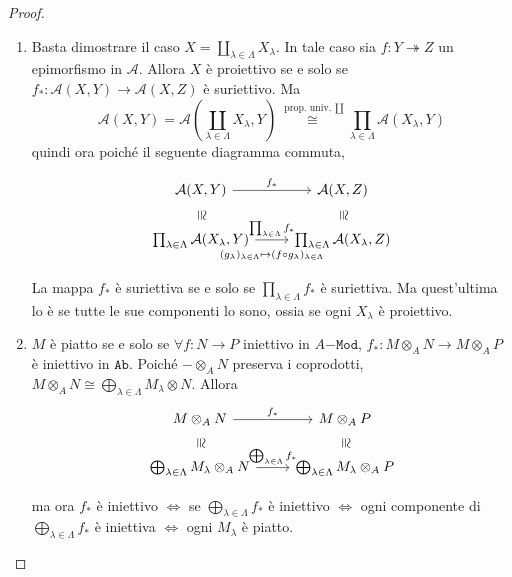 \begin{proof}{} \( \) 
\begin{enumerate}[label = \arabic*.]
    \item Basta dimostrare il caso \(X = \coprod_{\lambda \in \Lambda}
        X_\lambda\). In tale caso sia \(f : Y \twoheadrightarrow Z\) un
        epimorfismo in \(\mathcal{A}\). Allora \(X\) è proiettivo se e solo se
        \(f_* : \mathcal{A}{(X, Y)} \to \mathcal{A}{(X, Z)}\) è suriettivo. Ma
        \[
          \mathcal{A}{(X, Y)} = \mathcal{A}{\left( \coprod_{\lambda \in \Lambda}
          X_\lambda, Y \right)} \overset{\text{ prop. univ. \(\coprod\)}}{\cong}
          \prod_{\lambda \in \Lambda} \mathcal{A}{(X_\lambda, Y)}
        \]
        quindi ora poiché il seguente diagramma commuta, 

\[\begin{tikzcd}
	\mathcal{A}{(X, Y)} & \mathcal{A}{(X, Z)} \\
	\prod_{\lambda \in \Lambda} \mathcal{A}{(X_\lambda, Y)} & \prod_{\lambda \in \Lambda} \mathcal{A}{(X_\lambda, Z)}
	\arrow["{f_*}", from=1-1, to=1-2]
	\arrow["\cong"{marking, allow upside down}, draw=none, from=1-1, to=2-1]
	\arrow["\cong"{marking, allow upside down}, draw=none, from=1-2, to=2-2]
	\arrow["{\prod_{\lambda \in \Lambda}f_*}", from=2-1, to=2-2]
	\arrow["{(g_\lambda)_{\lambda \in \Lambda} \mapsto (f \circ g_\lambda)_{\lambda \in \Lambda}}"', shift right=2, draw=none, from=2-1, to=2-2]
\end{tikzcd}\]

        La mappa \(f_*\) è suriettiva se e solo se \(\prod_{\lambda \in \Lambda}
        f_*\) è suriettiva. Ma quest'ultima lo è se tutte le sue componenti lo
        sono, ossia se ogni \(X_\lambda\) è proiettivo.
    \item \(M\) è piatto se e solo se \(\forall f : N \to P\) iniettivo in
        \(A\mathtt{-Mod}\), \(f_* : M \otimes_A N \to M \otimes_A P\) è
        iniettivo in \(\mathtt{Ab}\). Poiché \(- \otimes_A N\) preserva i
        coprodotti, \(M \otimes_A N \cong \bigoplus_{\lambda \in \Lambda} M_\lambda
        \otimes N\). Allora
\[\begin{tikzcd}
	M \otimes_A N & M \otimes_A P \\
	\bigoplus_{\lambda \in \Lambda} M_{\lambda} \otimes_A N & \bigoplus_{\lambda \in \Lambda} M_\lambda \otimes_A P
	\arrow["{f_*}", from=1-1, to=1-2]
	\arrow["\cong"{marking, allow upside down}, draw=none, from=1-1, to=2-1]
	\arrow["\cong"{marking, allow upside down}, draw=none, from=1-2, to=2-2]
	\arrow["{\bigoplus_{\lambda \in \Lambda}f_*}", from=2-1, to=2-2]
\end{tikzcd}\]

    ma ora \(f_*\) è iniettivo \(\iff\) se \(\bigoplus_{\lambda \in \Lambda}
    f_*\) è iniettivo \(\iff\) ogni componente di \(\bigoplus_{\lambda \in
    \Lambda} f_* \) è iniettiva \(\iff\) ogni \(M_\lambda\) è piatto.
\end{enumerate}
\end{proof}

